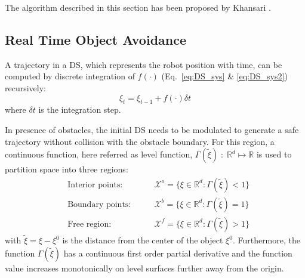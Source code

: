 The algorithm described in this section has been proposed by Khansari \cite{khansari2012dynamical}.

\subsection{Real Time Object Avoidance}
A trajectory in a DS, which represents the robot position with time, can be computed by discrete integration of $f(\cdot)$ (Eq.~\ref{eq:DS_sys} \& \ref{eq:DS_sys2}) recursively:
\begin{equation}
  \xi_{t} = \xi_{t-1} + f(\cdot) \delta t
\end{equation}
where $\delta t$ is the integration step.

In presence of obstacles, the initial DS needs to be modulated to generate a safe trajectory without collision with the obstacle boundary. For this region, a continuous function, here referred as level function, $\Gamma(\tilde \xi) \; : \;\mathbb{R}^d \mapsto \mathbb{R}$ is used to partition space into three regions:
\begin{align}
  &\text{Interior points:}  \qquad & \mathcal{X}^o = \{\xi \in \mathbb{R}^d: \Gamma(\tilde \xi) < 1 \} \\
  &\text{Boundary points:}  \qquad & \mathcal{X}^b = \{\xi \in \mathbb{R}^d: \Gamma(\tilde \xi) = 1 \} \\
  &\text{Free region:}  \qquad & \mathcal{X}^f = \{\xi \in \mathbb{R}^d: \Gamma(\tilde \xi) > 1 \}
\end{align}
with $\tilde \xi = \xi - \xi^0$ is the distance from the center of the object $\xi^0$. Furthermore, the function $\Gamma (\tilde \xi)$ has a continuous first order partial derivative and the function value increases monotonically on level surfaces further away from the origin.


